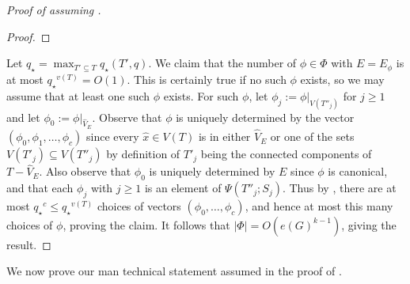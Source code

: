 \documentclass[12pt,letterpaper]{article}
\theoremstyle{definition}
\newcommand{\Pow}{{q_\star}} %
\newcommand{\sub}{\subseteq}
\begin{document}
\begin{proof}[Proof of  assuming ]
\begin{proof}
		\end{proof}
		
		Let $\displaystyle\Pow=\max_{T'\sub T} \Pow(T',q)$.  We claim that the number of $\phi\in \Phi$ with $E=E_\phi$ is at most $\Pow^{v(T)}=O(1)$.  This is certainly true if no such $\phi$ exists, so we may assume that at least one such $\phi$ exists.  For such $\phi$, let $\phi_j:=\phi|_{V(T''_j)}$ for $j\ge 1$ and let $\phi_0:=\phi|_{\widehat{V}_E}$.  Observe that $\phi$ is uniquely determined by the vector $(\phi_0,\phi_1,\ldots,\phi_c)$ since every $\hat{x}\in V(T)$ is in either $\widehat{V}_E$ or one of the sets $V(T'_j)\subseteq V(T''_j)$ by definition of $T'_j$ being the connected components of $T-\widehat{V}_E$.  Also observe that $\phi_0$ is uniquely determined by $E$ since $\phi$ is canonical, and that each $\phi_j$ with $j\ge 1$ is an element of $\Psi(T''_j;S_j)$.  Thus by , there are at most $\Pow^{c}\le \Pow^{v(T)}$ choices of vectors $(\phi_0,\ldots,\phi_c)$, and hence at most this many choices of $\phi$, proving the claim.  It follows that $|\Phi|=O(e(G)^{k-1})$, giving the result.
	\end{proof}
	
	We now prove our man technical statement assumed in the proof of .
	
\end{document}
